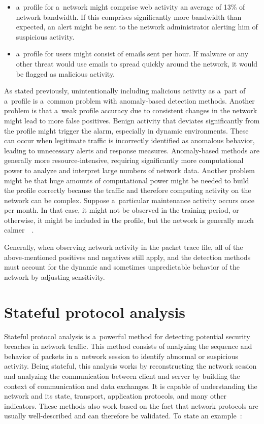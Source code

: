 \documentclass[
  printed,     %
  color,       %
  oneside,     %
  nosansbold,  %
  nocolorbold, %
  nolof,         %
  nolot,         %
]{fithesis4}
\begin{document}
\begin{itemize}
    \item a~profile for a~network might comprise web activity an average of 13\% of network bandwidth. If this comprises significantly more bandwidth than expected, an alert might be sent to the network administrator alerting him of suspicious activity.
    \item a~profile for users might consist of emails sent per hour. If malware or any other threat would use emails to spread quickly around the network, it would be flagged as malicious activity.
\end{itemize}

As stated previously, unintentionally including malicious activity as a~part of a~profile is a~common problem with anomaly-based detection methods. Another problem is that a~weak profile accuracy due to consistent changes in the network might lead to more false positives. Benign activity that deviates significantly from the profile might trigger the alarm, especially in dynamic environments. These can occur when legitimate traffic is incorrectly identified as anomalous behavior, leading to unnecessary alerts and response measures. Anomaly-based methods are generally more resource-intensive, requiring significantly more computational power to analyze and interpret large numbers of network data. Another problem might be that huge amounts of computational power might be needed to build the profile correctly because the traffic and therefore computing activity on the network can be complex. Suppose a~particular maintenance activity occurs once per month. In that case, it might not be observed in the training period, or otherwise, it might be included in the profile, but the network is generally much calmer~\cite{gtidaps}~\cite{LIAO201316}.

Generally, when observing network activity in the packet trace file, all of the above-mentioned positives and negatives still apply, and the detection methods must account for the dynamic and sometimes unpredictable behavior of the network by adjusting sensitivity.


\section{Stateful protocol analysis}

Stateful protocol analysis is a~powerful method for detecting potential security breaches in network traffic. This method consists of analyzing the sequence and behavior of packets in a~network session to identify abnormal or suspicious activity. Being stateful, this analysis works by reconstructing the network session and analyzing the communication between client and server by building the context of communication and data exchanges. It is capable of understanding the network and its state, transport, application protocols, and many other indicators. These methods also work based on the fact that network protocols are usually well-described and can therefore be validated. To state an example~\cite{gtidaps}:
\end{document}
